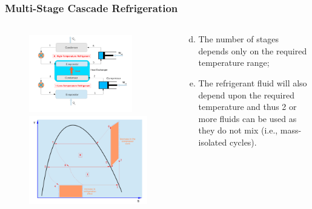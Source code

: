 \documentclass[10pt,compress,handout,ignorenonframetext]{beamer}
\begin{document}
\begin{frame}
 \frametitle{Multi-Stage Cascade Refrigeration}
 \begin{columns}
  \begin{column}[c]{0.45\linewidth}
   \begin{figure}%
     \vbox{
      \includegraphics[width=4.5cm,height=3.5cm,clip]{./Pics/Overview_Refrig24}
      \vspace{-.1cm}
      \includegraphics[width=4.cm,height=4.cm,clip]{./Pics/Overview_Refrig25}}
   \end{figure}  
  \end{column}  
  \begin{column}[c]{0.55\linewidth}
   \begin{enumerate}[(a)]\setcounter{enumi}{3}
    \item <1-> The number of stages depends only on the required temperature range;
    \item <2-> The refrigerant fluid will also depend upon the required temperature and thus 2 or more fluids can be used as they do not mix (i.e., mass-isolated cycles).
   \end{enumerate}
  \end{column}  
 \end{columns} 
\end{frame}
\end{document}
